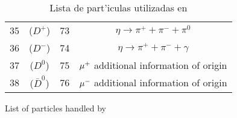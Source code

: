 {\begin{table}[htb]
\begin{center}
\begin{tabular}{rc|rc}
       35 & ($D^+$) &                                73 & $\eta \longrightarrow \pi^+ + \pi^- + \pi^0$ \\  
       36 & ($D^-$) &                                74 & $\eta \longrightarrow \pi^+ + \pi^- + \gamma$ \\ 
       37 & ($D^0$) &                                75 & $\mu^+$  additional information of origin \\   
       38 & ($\bar{D}^0$) &                          76 & $\mu^-$  additional information of origin \\   
\hline
\end{tabular}
\end{center}
\ifenglish
\caption{List of particles handled by \CORSIKA}
\else
\caption{Lista de part'iculas utilizadas en \CORSIKA}
\fi
\label{table:CORSIKAGeantcodesA}
\end{table}
}

\def\CORSIKAGeanttableB{
\begin{table}[htb]
\begin{center}
Naming convention (extension) for nuclei\\
\begin{tabular}{rc}
\hline
Code & Particle\\
\hline %
\hline %
     $AAZZ$ & Nucleus of $ZZ$ protons and $(AA-ZZ)$ neutrons \\
          & restrictions:  $AA < 59$   and   $ZZ < AA+1$ \\
     9900 & \Cherenkov photons on the particle output file \\
\hline    
\end{tabular}
\end{center}
\ifenglish
\caption{List of particles handled by \CORSIKA (continuation)}
\else
\caption{Lista de part'iculas que son contempladas por \CORSIKA (continuaci'on)}
\fi
\label{table:CORSIKAGeantcodesB}
\end{table}
}

\def\CORSIKAstructfig{
\begin{figure}[p]
  \begin{center}
    \epsfig{file=corsikastruc.eps,width=0.75\textwidth}
    \caption{Structure of the \CORSIKA output.}
    \label{fig:corsikastruc} 
  \end{center} 
\end{figure}
}

